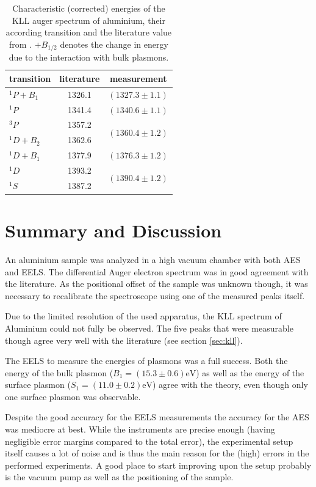\documentclass[a4paper]{scrartcl}
\numberwithin{equation}{section}
\numberwithin{figure}{section}
\numberwithin{table}{section}
\begin{document}
\begin{table}[!h]
\centering
\begin{tabular}{lcc}
\toprule
transition & literature & measurement \\
\midrule
$^1P + B_1$ & 1326.1 & $(1327.3\pm 1.1)$  \\
\midrule
$^1P$ 		& 1341.4 & $(1340.6\pm 1.1)$ \\
\midrule
$^3P$ 		& 1357.2 & \multirow{2}{*}{$(1360.4\pm 1.2)$}  \\
$^1D + B_2$ & 1362.6 & \\
\midrule
$^1D + B_1$ & 1377.9 & $(1376.3\pm 1.2)$ \\
\midrule
$^1D$ 		& 1393.2 & \multirow{2}{*}{$(1390.4\pm 1.2)$}  \\
$^1S$ 	   & 1387.2 & \\
 \bottomrule
\end{tabular}

\caption{\small Characteristic (corrected) energies of the KLL auger spectrum of aluminium, their according transition and the literature value from \cite{paper}. $+B_{1/2}$ denotes the change in energy due to the interaction with bulk plasmons. }

\label{A}
\end{table}


\FloatBarrier
\section{Summary and Discussion}
An aluminium sample was analyzed in a high vacuum chamber with both AES and EELS. The differential Auger electron spectrum was in good agreement with the literature. As the positional offset of the sample was unknown though, it was necessary to recalibrate the spectroscope using one of the measured peaks itself.

Due to the limited resolution of the used apparatus, the KLL spectrum of Aluminium could not fully be observed. The five peaks that were measurable though agree very well with the literature (see section \ref{sec:kll}).

The EELS to measure the energies of plasmons was a full success. Both the energy of the bulk plasmon ($B_1 = (15.3\pm 0.6)\text{eV}$) as well as the energy of the surface plasmon ($S_1 = (11.0\pm 0.2)\text{eV}$) agree with the theory, even though only one surface plasmon was observable.

Despite the good accuracy for the EELS measurements the accuracy for the AES was mediocre at best. While the instruments are precise enough (having negligible error margins compared to the total error), the experimental setup itself causes a lot of noise and is thus the main reason for the (high) errors in the performed experiments. A good place to start improving upon the setup probably is the vacuum pump as well as the positioning of the sample.



\end{document}
